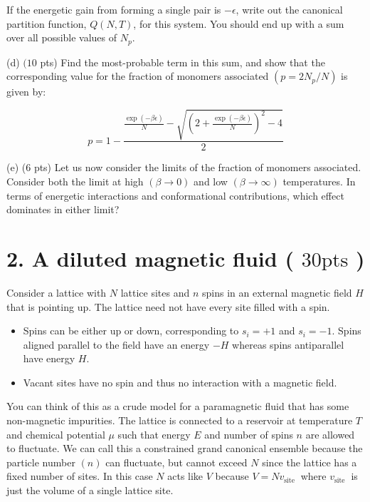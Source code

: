 \documentclass[10pt]{article}
\begin{document}
If the energetic gain from forming a single pair is $-\epsilon$, write out the canonical partition function, $Q(N, T)$, for this system. You should end up with a sum over all possible values of $N_{p}$.

(d) $(10$ pts) Find the most-probable term in this sum, and show that the corresponding value for the fraction of monomers associated $\left(p=2 N_{p} / N\right)$ is given by:

$$
p=1-\frac{\frac{\exp (-\beta \epsilon)}{N}-\sqrt{\left(2+\frac{\exp (-\beta \epsilon)}{N}\right)^{2}-4}}{2}
$$

(e) (6 pts) Let us now consider the limits of the fraction of monomers associated. Consider both the limit at high $(\beta \rightarrow 0)$ and low $(\beta \rightarrow \infty)$ temperatures. In terms of energetic interactions and conformational contributions, which effect dominates in either limit?

\section*{2. A diluted magnetic fluid ( $30 \mathrm{pts}$ )}
Consider a lattice with $N$ lattice sites and $n$ spins in an external magnetic field $H$ that is pointing up. The lattice need not have every site filled with a spin.

\begin{itemize}
  \item Spins can be either up or down, corresponding to $s_{i}=+1$ and $s_{i}=-1$. Spins aligned parallel to the field have an energy $-H$ whereas spins antiparallel have energy $H$.
  \item Vacant sites have no spin and thus no interaction with a magnetic field.
\end{itemize}

You can think of this as a crude model for a paramagnetic fluid that has some non-magnetic impurities. The lattice is connected to a reservoir at temperature $T$ and chemical potential $\mu$ such that energy $E$ and number of spins $n$ are allowed to fluctuate. We can call this a constrained grand canonical ensemble because the particle number $(n)$ can fluctuate, but cannot exceed $N$ since the lattice has a fixed number of sites. In this case $N$ acts like $V$ because $V=N v_{\text {site }}$ where $v_{\text {site }}$ is just the volume of a single lattice site.
\end{document}
